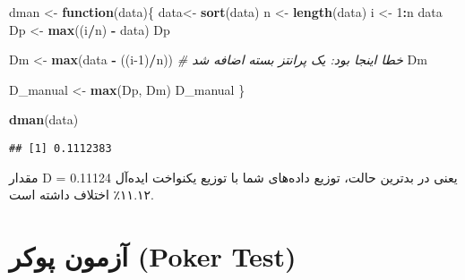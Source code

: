 \documentclass[
  persian,
]{article}
\newenvironment{Shaded}{\begin{snugshade}}{\end{snugshade}}
\newcommand{\CommentTok}[1]{\textcolor[rgb]{0.56,0.35,0.01}{\textit{#1}}}
\newcommand{\ControlFlowTok}[1]{\textcolor[rgb]{0.13,0.29,0.53}{\textbf{#1}}}
\newcommand{\DecValTok}[1]{\textcolor[rgb]{0.00,0.00,0.81}{#1}}
\newcommand{\FunctionTok}[1]{\textcolor[rgb]{0.13,0.29,0.53}{\textbf{#1}}}
\newcommand{\NormalTok}[1]{#1}
\newcommand{\OtherTok}[1]{\textcolor[rgb]{0.56,0.35,0.01}{#1}}
\newcommand{\SpecialCharTok}[1]{\textcolor[rgb]{0.81,0.36,0.00}{\textbf{#1}}}
\begin{document}
\latin

\begin{Shaded}
\begin{Highlighting}[]
\NormalTok{dman }\OtherTok{\textless{}{-}} \ControlFlowTok{function}\NormalTok{(data)\{}
\NormalTok{  data}\OtherTok{\textless{}{-}} \FunctionTok{sort}\NormalTok{(data)}
\NormalTok{  n }\OtherTok{\textless{}{-}} \FunctionTok{length}\NormalTok{(data)}
\NormalTok{  i }\OtherTok{\textless{}{-}} \DecValTok{1}\SpecialCharTok{:}\NormalTok{n}
\NormalTok{  data}
\NormalTok{  Dp }\OtherTok{\textless{}{-}} \FunctionTok{max}\NormalTok{((i}\SpecialCharTok{/}\NormalTok{n) }\SpecialCharTok{{-}}\NormalTok{ data)}
\NormalTok{  Dp}
  
\NormalTok{  Dm }\OtherTok{\textless{}{-}} \FunctionTok{max}\NormalTok{(data }\SpecialCharTok{{-}}\NormalTok{ ((i}\DecValTok{{-}1}\NormalTok{)}\SpecialCharTok{/}\NormalTok{n)) }\CommentTok{\# خطا اینجا بود: یک پرانتز بسته اضافه شد}
\NormalTok{  Dm}
  
\NormalTok{  D\_manual }\OtherTok{\textless{}{-}} \FunctionTok{max}\NormalTok{(Dp, Dm)}
\NormalTok{  D\_manual}
\NormalTok{\}}

\FunctionTok{dman}\NormalTok{(data)}
\end{Highlighting}
\end{Shaded}

\persian\latin

\begin{verbatim}
## [1] 0.1112383
\end{verbatim}

\persian

مقدار D = 0.11124 یعنی در بدترین حالت، توزیع داده‌های شما با توزیع
یکنواخت ایده‌آل ۱۱.۱۲٪ اختلاف داشته است.

\section{آزمون پوکر (Poker
Test)}\label{ux622ux632ux645ux648ux646-ux67eux648ux6a9ux631-poker-test}

\latin
\end{document}
